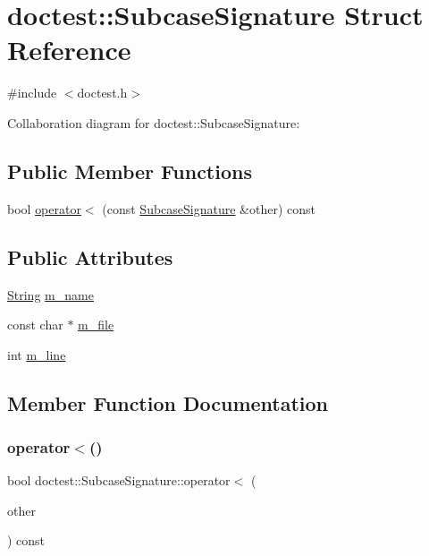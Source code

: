 \hypertarget{structdoctest_1_1SubcaseSignature}{}\section{doctest\+:\+:Subcase\+Signature Struct Reference}
\label{structdoctest_1_1SubcaseSignature}


{\ttfamily \#include $<$doctest.\+h$>$}



Collaboration diagram for doctest\+:\+:Subcase\+Signature\+:
\subsection*{Public Member Functions}
\begin{DoxyCompactItemize}
\item 
bool \hyperlink{structdoctest_1_1SubcaseSignature_a07364f9dddf615f51e15f09b994d4bef}{operator$<$} (const \hyperlink{structdoctest_1_1SubcaseSignature}{Subcase\+Signature} \&other) const
\end{DoxyCompactItemize}
\subsection*{Public Attributes}
\begin{DoxyCompactItemize}
\item 
\hyperlink{classdoctest_1_1String}{String} \hyperlink{structdoctest_1_1SubcaseSignature_a61081d1b920e862241e6f81731fb8a58}{m\+\_\+name}
\item 
const char $\ast$ \hyperlink{structdoctest_1_1SubcaseSignature_adc680b4597c89fb81ae8fed7fc41414d}{m\+\_\+file}
\item 
int \hyperlink{structdoctest_1_1SubcaseSignature_a73fb5432d0f8b82ffbe262b86af5c643}{m\+\_\+line}
\end{DoxyCompactItemize}


\subsection{Member Function Documentation}
\mbox{\label{structdoctest_1_1SubcaseSignature_a07364f9dddf615f51e15f09b994d4bef}} 
\subsubsection{\texorpdfstring{operator$<$()}{operator<()}}
{\footnotesize\ttfamily bool doctest\+::\+Subcase\+Signature\+::operator$<$ (\begin{DoxyParamCaption}\item[{const \hyperlink{structdoctest_1_1SubcaseSignature}{Subcase\+Signature} \&}]{other }\end{DoxyParamCaption}) const}



